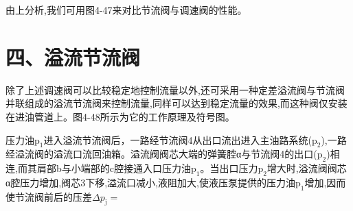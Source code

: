 由上分析,我们可用图4-47来对比节流阀与调速阀的性能。

\section*{四、溢流节流阀}

除了上述调速阀可以比较稳定地控制流量以外,还可采用一种定差溢流阀与节流阀并联组成的溢流节流阀来控制流量,同样可以达到稳定流量的效果,而这种阀仅安装在进油管道上。图4-48所示为它的工作原理及符号图。

压力油$\text{p}_1$进入溢流节流阀后，一路经节流阀4从出口流出进入主油路系统($\text{p}_2$),一路经溢流阀的溢流口流回油箱。溢流阀阀芯大端的弹簧腔α与节流阀4的出口($\text{p}_2$)相连,而其肩部b与小端部的c腔接通入口压力油$\text{p}_1$。当出口压力$\text{p}_2$增大时,溢流阀阀芯α腔压力增加,阀芯3下移,溢流口减小,液阻加大,使液压泵提供的压力油$\text{p}_1$增加,因而使节流阀前后的压差$\Delta p_\text{j} = $
